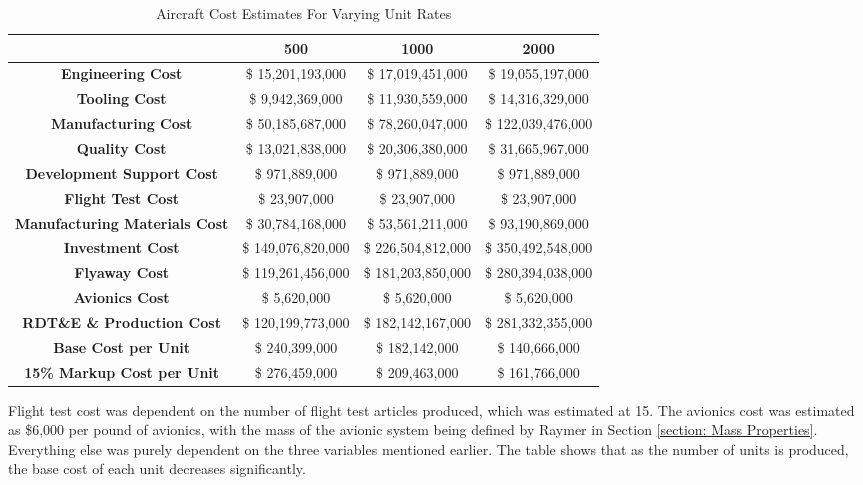 \begin{table}[!h]
    \centering
        \caption{Aircraft Cost Estimates For Varying Unit Rates}
    \begin{tabular}{|c||c|c|c|}\toprule
         & \textbf{500} & \textbf{1000} & \textbf{2000} \\\hline \hline
         \textbf{Engineering Cost} & \$ 15,201,193,000 & \$ 17,019,451,000 & \$ 19,055,197,000 \\ \hline
         \textbf{Tooling Cost} & \$ 9,942,369,000 & \$ 11,930,559,000 & \$ 14,316,329,000 \\ \hline
         \textbf{Manufacturing Cost} & \$ 50,185,687,000 & \$ 78,260,047,000 & \$ 122,039,476,000 \\ \hline
         \textbf{Quality Cost} &  \$ 13,021,838,000  & \$ 20,306,380,000 & \$ 31,665,967,000 \\ \hline
         \textbf{Development Support Cost} & \$  971,889,000  & \$ 971,889,000 & \$ 971,889,000  \\ \hline
         \textbf{Flight Test Cost} &  \$ 23,907,000 & \$ 23,907,000 & \$ 23,907,000 \\ \hline
         \textbf{Manufacturing Materials Cost} &  \$   30,784,168,000    &  \$   53,561,211,000  &  \$   93,190,869,000 \\ \hline
         \textbf{Investment Cost} & \$  149,076,820,000  & \$  226,504,812,000  & \$  350,492,548,000  \\ \hline
         \textbf{Flyaway Cost} &  \$  119,261,456,000  &  \$  181,203,850,000  &  \$  280,394,038,000  \\ \hline
         \textbf{Avionics Cost} &  \$ 5,620,000 & \$ 5,620,000 & \$ 5,620,000  \\ \hline
         \textbf{RDT\&E \& Production Cost} &  \$  120,199,773,000  &  \$  182,142,167,000  &  \$  281,332,355,000   \\ \hline
         \textbf{Base Cost per Unit} &  \$  240,399,000  &  \$  182,142,000  &  \$  140,666,000  \\ \hline
         \textbf{15\% Markup Cost per Unit} &  \$  276,459,000 &  \$  209,463,000  &  \$  161,766,000 \\\bottomrule
    \end{tabular}
    \label{tab:prodcost}
\end{table}

Flight test cost was dependent on the number of flight test articles produced, which was estimated at 15. The avionics cost was estimated as \$6,000 per pound of avionics, with the mass of the avionic system being defined by Raymer \cite{raymer} in Section \ref{section: Mass Properties}. Everything else was purely dependent on the three variables mentioned earlier. The table shows that as the number of units is produced, the base cost of each unit decreases significantly. 

